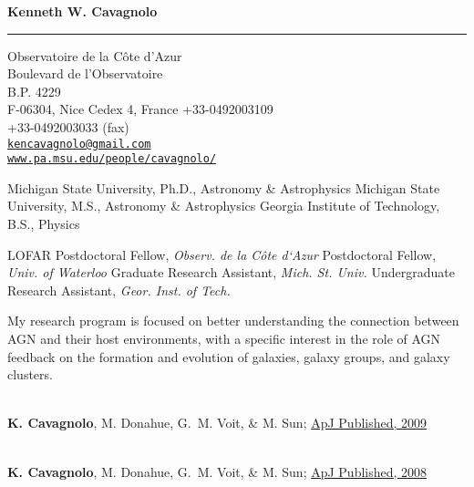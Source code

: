 \documentclass[11pt]{cv}
\begin{document}
\begin{center}
{\large \textbf{Kenneth W. Cavagnolo}}
\rule{17.35cm}{2pt}
\end{center}

\addresses
{
Observatoire de la C\^ote d'Azur\\
Boulevard de l'Observatoire\\
B.P. 4229\\
F-06304, Nice Cedex 4, France
}
{
+33-0492003109\\
+33-0492003033 (fax)\\
\href{mailto:kencavagnolo@gmail.com}{\tt{kencavagnolo@gmail.com}}\\
\href{http://www.pa.msu.edu/people/cavagnolo/}{\tt www.pa.msu.edu/people/cavagnolo/}\\
}

\begin{llist}

Michigan State University, Ph.D., Astronomy \& Astrophysics
Michigan State University, M.S., Astronomy \& Astrophysics
Georgia Institute of Technology, B.S., Physics

LOFAR Postdoctoral Fellow, {\textit{Observ. de la C\^ote d`Azur}}
Postdoctoral Fellow, {\textit{Univ. of Waterloo}}
Graduate Research Assistant, {\textit{Mich. St. Univ.}}
Undergraduate Research Assistant, {\textit{Geor. Inst. of Tech.}}

My research program is focused on better understanding the connection
between AGN and their host environments, with a specific interest in
the role of AGN feedback on the formation and evolution of galaxies,
galaxy groups, and galaxy clusters.

{}\\
{\bf K. Cavagnolo}, M. Donahue, G.~M. Voit, \& M. Sun; \href{http://adsabs.harvard.edu/abs/2009ApJS..182...12C}{ApJ Published, 2009}

{}\\
{\bf K. Cavagnolo}, M. Donahue, G.~M. Voit, \& M. Sun; \href{http://adsabs.harvard.edu/abs/2008ApJ...683L.107C}{ApJ Published, 2008}


\end{llist}
\end{document}
